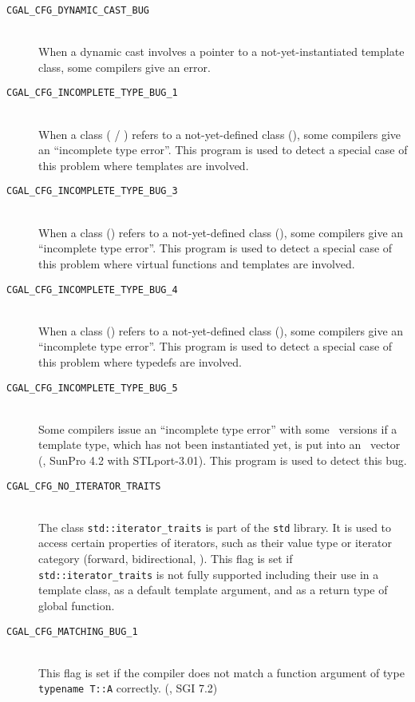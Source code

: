 \begin{description}
\item[{\tt CGAL\_CFG\_DYNAMIC\_CAST\_BUG}]~\\
 When a dynamic cast involves a pointer to a not-yet-instantiated 
 template class, some compilers give an error.

\item[{\tt CGAL\_CFG\_INCOMPLETE\_TYPE\_BUG\_1}]~\\
  When a class ( / ) refers to a not-yet-defined class
  (), some compilers give an ``incomplete type error''.  This
  program is used to detect a special case of this problem where
  templates are involved.

\item[{\tt CGAL\_CFG\_INCOMPLETE\_TYPE\_BUG\_3}]~\\
  When a class () refers to a not-yet-defined class (), some
  compilers give an ``incomplete type error''.  This program is used
  to detect a special case of this problem where virtual functions and
  templates are involved.

\item[{\tt CGAL\_CFG\_INCOMPLETE\_TYPE\_BUG\_4}]~\\
  When a class () refers to a not-yet-defined class (), some
  compilers give an ``incomplete type error''.  This program is used
  to detect a special case of this problem where typedefs are
  involved.

\item[{\tt CGAL\_CFG\_INCOMPLETE\_TYPE\_BUG\_5}]~\\
  Some compilers issue an ``incomplete type error'' with some \stl\
  versions if a template type, which has not been instantiated yet, is
  put into an \stl\ vector (\eg, SunPro 4.2 with STLport-3.01). This
  program is used to detect this bug.

\item[{\tt CGAL\_CFG\_NO\_ITERATOR\_TRAITS}]~\\
  The class \texttt{std::iterator\_traits} is part of the \texttt{std} library.
  It is used to access certain properties of iterators, such as their value
  type or iterator category (forward, bidirectional, \etc).
  This flag is set if \texttt{std::iterator\_traits} is not fully supported 
  including their use in a template class, as a default template
  argument, and as a return type of global function.

\item[{\tt CGAL\_CFG\_MATCHING\_BUG\_1}]~\\
 This flag is set if the compiler does not match a function
 argument of type {\tt typename T::A} correctly.
 (\eg, SGI 7.2)


\end{description}
